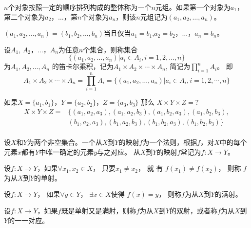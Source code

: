   \begin{Def}
    $n$个对象按照一定的顺序排列构成的整体称为一个$n$元组。如果第一个对象为$a_1$，第二个对象为$a_2$，$\ldots$，第$n$个对象为$a_n$，则该$n$元组记为$(a_1,a_2, \ldots, a_n)$。

 $(a_1,a_2, \ldots, a_n)=(b_1,b_2, \ldots, b_n)$当且仅当$a_1=b_1$,$a_2=b_2$，$\ldots$，$a_n=b_n$。
  \end{Def}
  \begin{Def}
    设$A_1$, $A_2$，$\ldots$，$A_n$为任意$n$个集合，则称集合 \[\{(a_1,a_2, \ldots, a_n)|a_i\in A_i, i = 1,2,\ldots, n\}\] 为$A_1, A_2, \ldots, A_n$ 的笛卡尔乘积，记为$A_1 \times A_2 \times \cdots \times A_n$, 简记为$\prod_{i=1}^nA_i$。
即
\begin{equation*}
  A_1 \times A_2 \times \cdots \times A_n = \prod_{i=1}^nA_i = \{(a_1,a_2, \ldots, a_n)|a_i \in A_i, i = 1, 2, \cdots, n\}
\end{equation*}
  \end{Def}
  \begin{Example}
    如果$X=\{a_1,b_1\}$，$Y=\{a_2,b_2\}$，$Z=\{a_3,b_3\}$ 那么 $X \times Y \times Z = ?$
    \begin{equation*}
      \begin{split}
       X \times Y \times Z =& \{ (a_1,a_2, a_3), (a_1,a_2, b_3), (a_1, b_2, a_3), (a_1,b_2, b_3), \\
&(b_1, a_2, a_3), (b_1, a_2, b_3), (b_1, b_2, a_3), (b_1, b_2, b_3) \}\\
      \end{split}
    \end{equation*}
  \end{Example}

  \begin{Def}
    设$X$和$Y$为两个非空集合。一个从$X$到$Y$的映射$f$为一个法则，根据$f$，对$X$中的每个元素$x$都有$Y$中唯一确定的元素$y$与之对应。
    从$X$到$Y$的映射$f$常记为$f:X\to Y$。
  \end{Def}
    \begin{Def}
    设$f:X\to Y$，如果$\forall x_1, x_2 \in X$， 只要$x_1 \neq x_2$，  就 有 $f(x_1) \neq f(x_2)$，   则称 $f$为从$X$到$Y$的单射。
  \end{Def}
  \begin{Def}
    设$f:X\to Y$， 如果$\forall y \in Y$， $\exists x \in X$使得 $f(x) = y$， 则称$f$为从$X$到$Y$的满射。
  \end{Def}
  \begin{Def}
    设$f:X\to Y$，如果$f$既是单射又是满射，则称$f$为从$X$到$Y$的双射，或者称$f$为从$X$到$Y$的一一对应。
  \end{Def}

